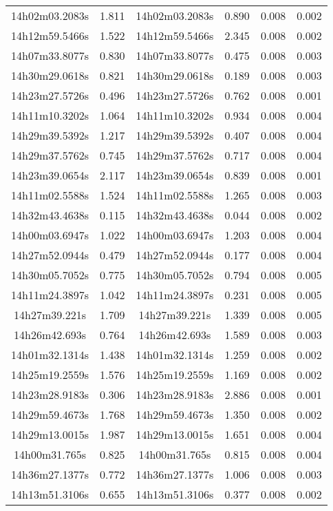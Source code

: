 \begin{table}
\begin{tabular}{cccccc}
14h02m03.2083s & 1.811 & 14h02m03.2083s & 0.890 & 0.008 & 0.002 \\
14h12m59.5466s & 1.522 & 14h12m59.5466s & 2.345 & 0.008 & 0.002 \\
14h07m33.8077s & 0.830 & 14h07m33.8077s & 0.475 & 0.008 & 0.003 \\
14h30m29.0618s & 0.821 & 14h30m29.0618s & 0.189 & 0.008 & 0.003 \\
14h23m27.5726s & 0.496 & 14h23m27.5726s & 0.762 & 0.008 & 0.001 \\
14h11m10.3202s & 1.064 & 14h11m10.3202s & 0.934 & 0.008 & 0.004 \\
14h29m39.5392s & 1.217 & 14h29m39.5392s & 0.407 & 0.008 & 0.004 \\
14h29m37.5762s & 0.745 & 14h29m37.5762s & 0.717 & 0.008 & 0.004 \\
14h23m39.0654s & 2.117 & 14h23m39.0654s & 0.839 & 0.008 & 0.001 \\
14h11m02.5588s & 1.524 & 14h11m02.5588s & 1.265 & 0.008 & 0.003 \\
14h32m43.4638s & 0.115 & 14h32m43.4638s & 0.044 & 0.008 & 0.002 \\
14h00m03.6947s & 1.022 & 14h00m03.6947s & 1.203 & 0.008 & 0.004 \\
14h27m52.0944s & 0.479 & 14h27m52.0944s & 0.177 & 0.008 & 0.004 \\
14h30m05.7052s & 0.775 & 14h30m05.7052s & 0.794 & 0.008 & 0.005 \\
14h11m24.3897s & 1.042 & 14h11m24.3897s & 0.231 & 0.008 & 0.005 \\
14h27m39.221s & 1.709 & 14h27m39.221s & 1.339 & 0.008 & 0.005 \\
14h26m42.693s & 0.764 & 14h26m42.693s & 1.589 & 0.008 & 0.003 \\
14h01m32.1314s & 1.438 & 14h01m32.1314s & 1.259 & 0.008 & 0.002 \\
14h25m19.2559s & 1.576 & 14h25m19.2559s & 1.169 & 0.008 & 0.002 \\
14h23m28.9183s & 0.306 & 14h23m28.9183s & 2.886 & 0.008 & 0.001 \\
14h29m59.4673s & 1.768 & 14h29m59.4673s & 1.350 & 0.008 & 0.002 \\
14h29m13.0015s & 1.987 & 14h29m13.0015s & 1.651 & 0.008 & 0.004 \\
14h00m31.765s & 0.825 & 14h00m31.765s & 0.815 & 0.008 & 0.004 \\
14h36m27.1377s & 0.772 & 14h36m27.1377s & 1.006 & 0.008 & 0.003 \\
14h13m51.3106s & 0.655 & 14h13m51.3106s & 0.377 & 0.008 & 0.002 \\

\end{tabular}
\end{table}
